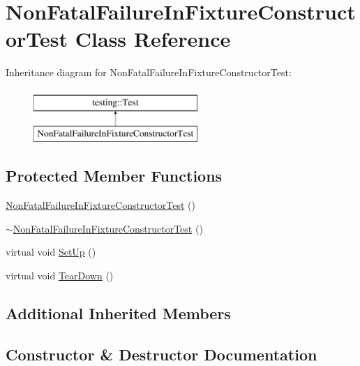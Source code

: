\hypertarget{classNonFatalFailureInFixtureConstructorTest}{}\section{Non\+Fatal\+Failure\+In\+Fixture\+Constructor\+Test Class Reference}
\label{classNonFatalFailureInFixtureConstructorTest}
Inheritance diagram for Non\+Fatal\+Failure\+In\+Fixture\+Constructor\+Test\+:\begin{figure}[H]
\begin{center}
\leavevmode
\includegraphics[height=2.000000cm]{classNonFatalFailureInFixtureConstructorTest}
\end{center}
\end{figure}
\subsection*{Protected Member Functions}
\begin{DoxyCompactItemize}
\item 
\mbox{\hyperlink{classNonFatalFailureInFixtureConstructorTest_a87a70e2b18b981c627c43f2af85a9345}{Non\+Fatal\+Failure\+In\+Fixture\+Constructor\+Test}} ()
\item 
\mbox{\hyperlink{classNonFatalFailureInFixtureConstructorTest_a732fa961c4bb68b3390e4a49a8375619}{$\sim$\+Non\+Fatal\+Failure\+In\+Fixture\+Constructor\+Test}} ()
\item 
virtual void \mbox{\hyperlink{classNonFatalFailureInFixtureConstructorTest_a7d951f8fbf7b2ac5046be8d8ee7b03d3}{Set\+Up}} ()
\item 
virtual void \mbox{\hyperlink{classNonFatalFailureInFixtureConstructorTest_ab76d79c346d9a378d625fde5739e8ad6}{Tear\+Down}} ()
\end{DoxyCompactItemize}
\subsection*{Additional Inherited Members}


\subsection{Constructor \& Destructor Documentation}
\mbox{\label{classNonFatalFailureInFixtureConstructorTest_a87a70e2b18b981c627c43f2af85a9345}} 

